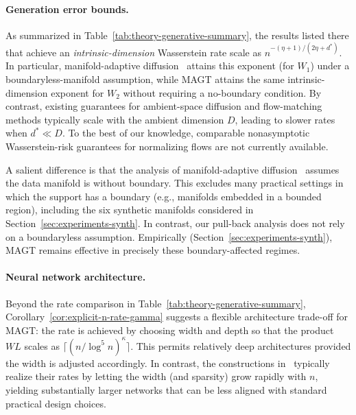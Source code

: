 \documentclass[12pt]{article}
\theoremstyle{definition} %
\providecommand{\method}{MAGT} %
\begin{document}
\paragraph{Generation error bounds.}
As summarized in Table~\ref{tab:theory-generative-summary}, the results listed there that achieve an \emph{intrinsic-dimension} Wasserstein rate scale as
$n^{-(\eta+1)/(2\eta+d^*)}$. In particular, manifold-adaptive diffusion~\citep{tang2024adaptivity} attains this exponent (for $W_1$) under a boundaryless-manifold assumption, while \method{} attains the same intrinsic-dimension exponent for $W_2$ without requiring a no-boundary condition.
By contrast, existing guarantees for ambient-space diffusion and flow-matching methods typically scale with the ambient dimension $D$, leading to slower rates when $d^*\ll D$.
To the best of our knowledge, comparable nonasymptotic Wasserstein-risk guarantees for normalizing flows are not currently available.

A salient difference is that the analysis of manifold-adaptive diffusion~\citep{tang2024adaptivity} assumes the data manifold is without boundary.
This excludes many practical settings in which the support has a boundary (e.g., manifolds embedded in a bounded region), including the six synthetic manifolds considered in Section~\ref{sec:experiments-synth}.
In contrast, our pull-back analysis does not rely on a boundaryless assumption.
Empirically (Section~\ref{sec:experiments-synth}), \method{} remains effective in precisely these boundary-affected regimes.

\paragraph{Neural network architecture.}
Beyond the rate comparison in Table~\ref{tab:theory-generative-summary}, Corollary~\ref{cor:explicit-n-rate-gamma} suggests a flexible architecture trade-off for \method{}:
the rate is achieved by choosing width and depth so that the product $WL$ scales as
$\lceil (n/\log^5 n)^{\kappa}\rceil$.
This permits relatively deep architectures provided the width is adjusted accordingly.
In contrast, the constructions in~\citet{oko2023diffusion,tang2024adaptivity} typically realize their rates by letting the width (and sparsity) grow rapidly with $n$, yielding substantially larger networks that can be less aligned with standard practical design choices.
\end{document}
